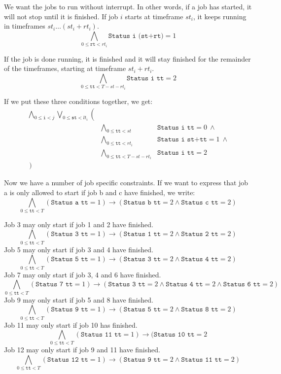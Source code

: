 \documentclass[12pt]{article}
\begin{document}
We want the jobs to run without interrupt.
In other words, if a job has started, it will not stop until it is finished. 
If job $i$ starts at timeframe $st_i$, it keeps running in timeframes $st_i \dots (st_i + rt_i)$.
\[ \bigwedge_{0 \le \texttt{rt} < rt_i} \texttt{Status i (st+rt)} = 1 \]

If the job is done running, it is finished and it will stay finished for the remainder of the timeframes, starting at timeframe $st_i + rt_i$.
\[ \bigwedge_{0 \le \texttt{tt} < T-st-rt_i} \texttt{Status i tt} = 2 \]

If we put these three conditions together, we get:
\[ \begin{array}{rll}
    \bigwedge_{0 \le \texttt{i} < j} \bigvee_{0 \le \texttt{st} < lt_i} \left( \right.&& \\
    & \bigwedge_{0 \le \texttt{tt} < st} & \texttt{Status i tt} = 0 ~ \wedge \\
    & \bigwedge_{0 \le \texttt{tt} < rt_i} & \texttt{Status i st+tt} = 1 ~ \wedge \\
    & \bigwedge_{0 \le \texttt{tt} < T-st-rt_i} & \texttt{Status i tt} = 2 \\
\left. \right)
\end{array} \]

Now we have a number of job specific constraints. 
If we want to express that job a is only allowed to start if job b and c have finished, we write: 
\[ \bigwedge_{0 \le \texttt{tt} < T} (\texttt{Status a tt} = 1) \rightarrow (\texttt{Status b tt} = 2 \wedge \texttt{Status c tt} = 2) \]

Job 3 may only start if job 1 and 2 have finished.
\[ \bigwedge_{0 \le \texttt{tt} < T} (\texttt{Status 3 tt} = 1) \rightarrow (\texttt{Status 1 tt} = 2 \wedge \texttt{Status 2 tt} = 2) \]
Job 5 may only start if job 3 and 4 have finished.
\[ \bigwedge_{0 \le \texttt{tt} < T} (\texttt{Status 5 tt} = 1) \rightarrow (\texttt{Status 3 tt} = 2 \wedge \texttt{Status 4 tt} = 2) \]
Job 7 may only start if job 3, 4 and 6 have finished.
\[ \bigwedge_{0 \le \texttt{tt} < T} (\texttt{Status 7 tt} = 1) \rightarrow (\texttt{Status 3 tt} = 2 \wedge \texttt{Status 4 tt} = 2 \wedge \texttt{Status 6 tt} = 2) \]
Job 9 may only start if job 5 and 8 have finished.
\[ \bigwedge_{0 \le \texttt{tt} < T} (\texttt{Status 9 tt} = 1) \rightarrow (\texttt{Status 5 tt} = 2 \wedge \texttt{Status 8 tt} = 2) \]
Job 11 may only start if job 10 has finished.
\[ \bigwedge_{0 \le \texttt{tt} < T} (\texttt{Status 11 tt} = 1) \rightarrow (\texttt{Status 10 tt} = 2\]
Job 12 may only start if job 9 and 11 have finished.
\[ \bigwedge_{0 \le \texttt{tt} < T} (\texttt{Status 12 tt} = 1) \rightarrow (\texttt{Status 9 tt} = 2 \wedge \texttt{Status 11 tt} = 2) \]
\end{document}
